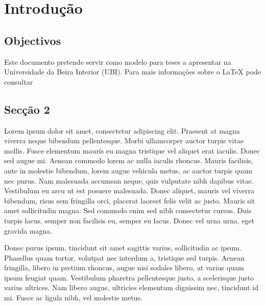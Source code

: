 \chapter{Introdução}
\label{chap:int}





\section{Objectivos}
Este documento pretende servir como modelo para teses a apresentar na Universidade da Beira Interior (UBI). Para mais informações sobre o {\LaTeX} pode consultar %

\section{Secção 2}
\label{sec2}
Lorem ipsum dolor sit amet, consectetur adipiscing elit. Praesent at magna viverra neque bibendum pellentesque. Morbi ullamcorper auctor turpis vitae mollis. Fusce elementum mauris eu magna tristique vel aliquet erat iaculis. Donec sed augue mi. Aenean commodo lorem ac nulla iaculis rhoncus. Mauris facilisis, ante in molestie bibendum, lorem augue vehicula metus, ac auctor turpis quam nec purus. Nam malesuada accumsan neque, quis vulputate nibh dapibus vitae. Vestibulum eu arcu ut est posuere malesuada. Donec aliquet, mauris vel viverra bibendum, risus sem fringilla orci, placerat laoreet felis velit ac justo. Mauris sit amet sollicitudin magna. Sed commodo enim sed nibh consectetur cursus. Duis turpis lacus, semper non facilisis eu, semper eu lacus. Donec vel urna urna, eget gravida magna.

Donec purus ipsum, tincidunt sit amet sagittis varius, sollicitudin ac ipsum. Phasellus quam tortor, volutpat nec interdum a, tristique sed turpis. Aenean fringilla, libero in pretium rhoncus, augue nisi sodales libero, at varius quam ipsum feugiat quam. Vestibulum pharetra pellentesque justo, a scelerisque justo varius ultrices. Nam libero augue, ultricies elementum dignissim nec, tincidunt id mi. Fusce ac ligula nibh, vel molestie metus. 

